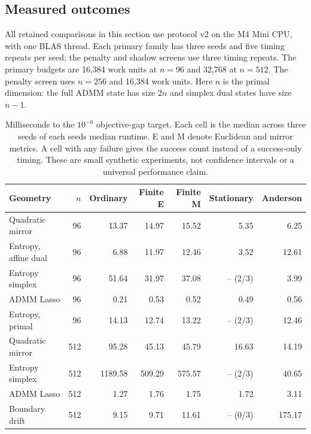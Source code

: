 \subsection{Measured outcomes}

All retained comparisons in this section use protocol v2 on the M4 Mini CPU, with one BLAS thread. Each primary family has three seeds and five timing repeats per seed; the penalty and shadow screens use three timing repeats. The primary budgets are 16,384 work units at $n=96$ and 32,768 at $n=512$. The penalty screen uses $n=256$ and 16,384 work units. Here $n$ is the primal dimension: the full ADMM state has size $2n$ and simplex dual states have size $n-1$.

\begin{table}[htbp]\centering\small

\begin{tabular}{lr rrrrr}\toprule

Geometry & $n$ & Ordinary & Finite E & Finite M & Stationary & Anderson\\\midrule

Quadratic mirror & 96 & 13.37 & 14.97 & 15.52 & 5.35 & 6.25\\

Entropy, affine dual & 96 & 6.88 & 11.97 & 12.46 & 3.52 & 12.61\\

Entropy simplex & 96 & 51.64 & 31.97 & 37.08 & -- (2/3) & 3.99\\

ADMM Lasso & 96 & 0.21 & 0.53 & 0.52 & 0.49 & 0.56\\

Entropy, primal & 96 & 14.13 & 12.74 & 13.22 & -- (2/3) & 12.46\\

\midrule

Quadratic mirror & 512 & 95.28 & 45.13 & 45.79 & 16.63 & 14.19\\

Entropy simplex & 512 & 1189.58 & 509.29 & 575.57 & -- (2/3) & 40.65\\

ADMM Lasso & 512 & 1.27 & 1.76 & 1.75 & 1.72 & 3.11\\

Boundary drift & 512 & 9.15 & 9.71 & 11.61 & -- (0/3) & 175.17\\

\bottomrule\end{tabular}

\caption{Milliseconds to the $10^{-6}$ objective-gap target. Each cell is the median across three seeds of each seed\textquotesingle s median runtime. E and M denote Euclidean and mirror metrics. A cell with any failure gives the success count instead of a success-only timing. These are small synthetic experiments, not confidence intervals or a universal performance claim.}

\label{tab:times}\end{table}

